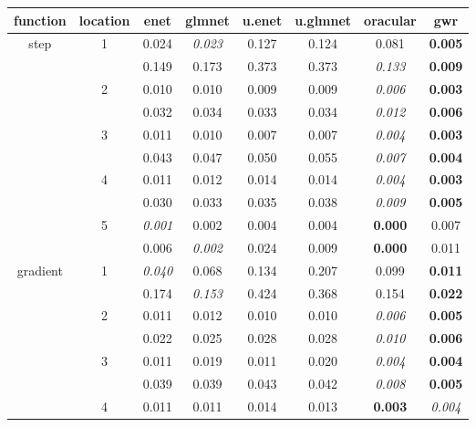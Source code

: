 \documentclass[authoryear, review, 11pt]{elsarticle}
\begin{document}
		\begin{table}
		\thispagestyle{empty}
		\begin{center}
		\begin{tabular}{cccccccc}
 function & location & enet & glmnet & u.enet & u.glmnet & oracular & gwr \\ 
  \hline
   \multirow{10}{*}{step} & \multirow{2}{*}{1} & 0.024 & \emph{0.023} & 0.127 & 0.124 & 0.081 & \textbf{0.005} \\ 
   &  & 0.149 & 0.173 & 0.373 & 0.373 & \emph{0.133} & \textbf{0.009} \\ 
   \cline{3-8}
   & \multirow{2}{*}{2} & 0.010 & 0.010 & 0.009 & 0.009 & \emph{0.006} & \textbf{0.003} \\ 
   &  & 0.032 & 0.034 & 0.033 & 0.034 & \emph{0.012} & \textbf{0.006} \\ 
   \cline{3-8}
   & \multirow{2}{*}{3} & 0.011 & 0.010 & 0.007 & 0.007 & \emph{0.004} & \textbf{0.003} \\ 
   &  & 0.043 & 0.047 & 0.050 & 0.055 & \emph{0.007} & \textbf{0.004} \\ 
   \cline{3-8}
   & \multirow{2}{*}{4} & 0.011 & 0.012 & 0.014 & 0.014 & \emph{0.004} & \textbf{0.003} \\ 
   &  & 0.030 & 0.033 & 0.035 & 0.038 & \emph{0.009} & \textbf{0.005} \\ 
   \cline{3-8}
   & \multirow{2}{*}{5} & \emph{0.001} & 0.002 & 0.004 & 0.004 & \textbf{0.000} & 0.007 \\ 
   &  & 0.006 & \emph{0.002} & 0.024 & 0.009 & \textbf{0.000} & 0.011 \\ 
   \hline
   \multirow{10}{*}{gradient} & \multirow{2}{*}{1} & \emph{0.040} & 0.068 & 0.134 & 0.207 & 0.099 & \textbf{0.011} \\ 
   &  & 0.174 & \emph{0.153} & 0.424 & 0.368 & 0.154 & \textbf{0.022} \\ 
   \cline{3-8}
   & \multirow{2}{*}{2} & 0.011 & 0.012 & 0.010 & 0.010 & \emph{0.006} & \textbf{0.005} \\ 
   &  & 0.022 & 0.025 & 0.028 & 0.028 & \emph{0.010} & \textbf{0.006} \\ 
   \cline{3-8}
   & \multirow{2}{*}{3} & 0.011 & 0.019 & 0.011 & 0.020 & \emph{0.004} & \textbf{0.004} \\ 
   &  & 0.039 & 0.039 & 0.043 & 0.042 & \emph{0.008} & \textbf{0.005} \\ 
   \cline{3-8}
   & \multirow{2}{*}{4} & 0.011 & 0.011 & 0.014 & 0.013 & \textbf{0.003} & \emph{0.004} \\ 

\end{tabular}
\end{center}
\end{table}
\end{document}
